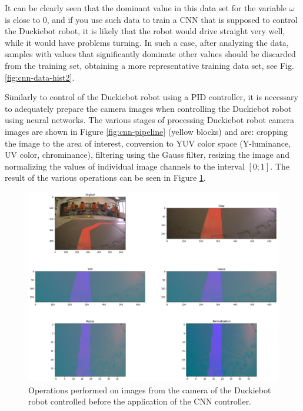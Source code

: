 \documentclass[conference]{IEEEtran}
\begin{document}
It can be clearly seen that the dominant value in this data set for the variable $\omega$ is close to $0$, and if you use such data to train a CNN that is supposed to control the Duckiebot robot, it is likely that the robot would drive straight very well, while it would have problems turning. In such a case, after analyzing the data, samples with values that significantly dominate other values should be discarded from the training set, obtaining a more representative training data set, see Fig. \ref{fig:cnn-data-hist2}.

Similarly to control of the Duckiebot robot using a PID controller, it is necessary to adequately prepare the camera images when controlling the Duckiebot robot using neural networks. The various stages of processing Duckiebot robot camera images are shown in Figure \ref{fig:cnn-pipeline} (yellow blocks) and are: cropping the image to the area of interest, conversion to YUV color space (Y-luminance, UV color, chrominance), filtering using the Gauss filter, resizing the image and normalizing the values of individual image channels to the interval $[0;1]$. The result of the various operations can be seen in Figure \ref{fig:cnn-image-prepare}.

\begin{figure}[h]
    \centering
    \includegraphics[width=.95\columnwidth]{nn_prepare_image}
    \caption{Operations performed on images from the camera of the Duckiebot robot controlled before the application of the CNN controller.}
    \label{fig:cnn-image-prepare}
\end{figure}

\end{document}
